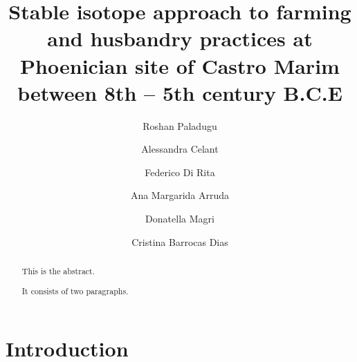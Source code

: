 \documentclass[5p]{elsarticle} %
\begin{document}
\begin{frontmatter}

  \title{Stable isotope approach to farming and husbandry practices at Phoenician site of Castro Marim between 8th -- 5th century B.C.E}
    \author[Universidade de Évora,Laboratório HERCULES]{Roshan Paladugu}
    \author[SAPIENZA Università di Roma]{Alessandra Celant}
    \author[SAPIENZA Università di Roma]{Federico Di Rita}
    \author[Universidade de Lisboa]{Ana Margarida Arruda}
    \author[SAPIENZA Università di Roma]{Donatella Magri}
    \author[Universidade de Évora,Laboratório HERCULES]{Cristina Barrocas Dias}
      \address[Universidade de Évora]{Departamento de Química, Escola de Ciências e Tecnologia, Universidade de Évora, Colégio Luís António Verney, Rua Romão Ramalho 59, Évora, Portugal (7000-671)}
    \address[Laboratório HERCULES]{Laboratório HERCULES, Universidade de Évora, Palácio do Vimioso, Largo Marquês de Marialva 8, 7000-554 Évora, Portugal}
    \address[SAPIENZA Università di Roma]{Dipartimento di Biologia Ambientale, SAPIENZA Università di Roma, Piazzale A. Moro 5, 00185 Roma, Italy}
    \address[Universidade de Lisboa]{Centro de Arqueologia da Universidade de Lisboa, Faculdade de Letras da Universidade de Lisboa, Alameda da Universidade, 1600-214, Lisboa, Portugal}
  
  \begin{abstract}
  This is the abstract.

  It consists of two paragraphs.
  \end{abstract}
  
 \end{frontmatter}

\hypertarget{introduction}{%
\section{Introduction}\label{introduction}}
\end{document}

